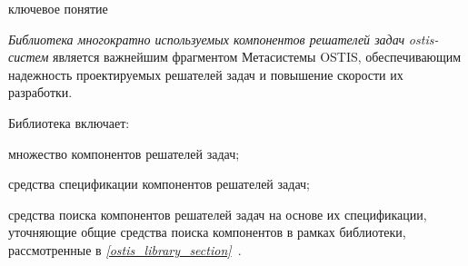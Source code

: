\begin{SCn}
\bigskip

\begin{scnrelfromlist}{ключевое понятие}
\end{scnrelfromlist}

\end{SCn}



\textit{Библиотека многократно используемых компонентов решателей задач} \textit{ostis-систем} является важнейшим фрагментом Метасистемы OSTIS, обеспечивающим надежность проектируемых решателей задач и повышение скорости их разработки.

Библиотека включает:
\begin{textitemize}
\item множество компонентов решателей задач;
\item средства спецификации компонентов решателей задач;
\item средства поиска компонентов решателей задач на основе их спецификации, уточняющие общие средства поиска компонентов в рамках библиотеки, рассмотренные в \textit{\ref{ostis_library_section}~}.
\end{textitemize}

